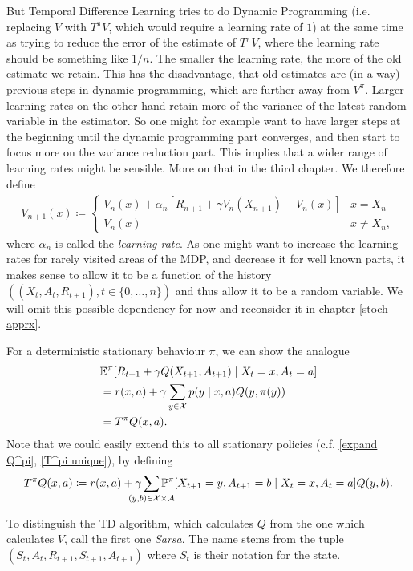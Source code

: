 But Temporal Difference Learning tries to do Dynamic Programming (i.e. replacing \(V\) with \(T^\pi V\), which would require a learning rate of \(1\)) at the same time as trying to reduce the error of the estimate of \(T^\pi V\), where the learning rate should be something like \(1/n\). The smaller the learning rate, the more of the old estimate we retain. This has the disadvantage, that old estimates are (in a way) previous steps in dynamic programming, which are further away from \(V^\pi\). Larger learning rates on the other hand retain more of the variance of the latest random variable in the estimator. So one might for example want to have larger steps at the beginning until the dynamic programming part converges, and then start to focus more on the variance reduction part. This implies that a wider range of learning rates might be sensible. More on that in the third chapter. We therefore define 
\begin{align}\label{TD learning}
	V_{n+1}(x) \coloneqq
	\begin{cases}
		V_n(x)+\alpha_n[R_{n+1}+\gamma V_n(X_{n+1}) - V_n(x)] & x=X_n\\
		V_n(x) & x\neq X_n,
	\end{cases}
\end{align}
where \(\alpha_n\) is called the \emph{learning rate}. As one might want to increase the learning rates for rarely visited areas of the MDP, and decrease it for well known parts, it makes sense to allow it to be a function of the history \(((X_t, A_t, R_{t+1}), t\in\{0,\dots, n\})\) and thus allow it to be a random variable. We will omit this possible dependency for now and reconsider it in chapter \ref{stoch apprx}.

For a deterministic stationary behaviour \(\pi\), we can show the analogue 
\begin{align*}
	&\mathbb{E}^\pi[R_{t+1}+\gamma Q(X_{t+1}, A_{t+1})\mid X_t=x, A_t=a]\\
	&=r(x,a) +\gamma \sum_{y\in\mathcal{X}}p(y\mid x,a)Q(y,\pi(y))\\
	&= T^\pi Q(x,a).
\end{align*}
Note that we could easily extend this to all stationary policies (c.f. \ref{expand Q^pi}, \ref{T^pi unique}), by defining
\[
	T^\pi Q(x,a)\coloneqq r(x,a) +\gamma \smashoperator{\sum_{(y,b)\in\cX\times\cA}}\Pr^\pi[X_{t+1}=y,A_{t+1}=b\mid X_t=x,A_t=a]Q(y,b).
\]

To distinguish the TD algorithm, which calculates \(Q\) from the one which calculates \(V\), \citeauthor{suttonReinforcementLearningIntroduction1998} call the first one \emph{Sarsa}. The name stems from the tuple \((S_t, A_t,R_{t+1},S_{t+1},A_{t+1})\) where \(S_t\) is their notation for the state. 

